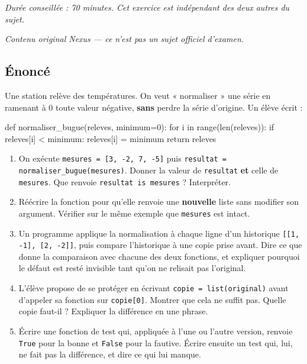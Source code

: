 \textit{Durée conseillée : 70 minutes. Cet exercice est indépendant des deux
autres du sujet.}

\medskip
\textit{Contenu original Nexus --- ce n'est pas un sujet officiel d'examen.}

\subsection*{Énoncé}

Une station relève des températures. On veut « normaliser » une série en
ramenant à $0$ toute valeur négative, \textbf{sans} perdre la série d'origine.
Un élève écrit :

\begin{python}
def normaliser_bugue(releves, minimum=0):
    for i in range(len(releves)):
        if releves[i] < minimum:
            releves[i] = minimum
    return releves
\end{python}

\begin{enumerate}
  \item On exécute \lstinline{mesures = [3, -2, 7, -5]} puis
    \lstinline{resultat = normaliser_bugue(mesures)}. Donner la valeur de
    \lstinline{resultat} \textbf{et} celle de \lstinline{mesures}. Que renvoie
    \lstinline{resultat is mesures} ? Interpréter.

  \item Réécrire la fonction pour qu'elle renvoie une \textbf{nouvelle} liste
    sans modifier son argument. Vérifier sur le même exemple que
    \lstinline{mesures} est intact.

  \item Un programme applique la normalisation à chaque ligne d'un historique
    \lstinline{[[1, -1], [2, -2]]}, puis compare l'historique à une copie prise
    avant. Dire ce que donne la comparaison avec chacune des deux fonctions, et
    expliquer pourquoi le défaut est resté invisible tant qu'on ne relisait pas
    l'original.

  \item L'élève propose de se protéger en écrivant
    \lstinline{copie = list(original)} avant d'appeler sa fonction sur
    \lstinline{copie[0]}. Montrer que cela ne suffit pas. Quelle copie faut-il ?
    Expliquer la différence en une phrase.

  \item Écrire une fonction de test qui, appliquée à l'une ou l'autre version,
    renvoie \lstinline{True} pour la bonne et \lstinline{False} pour la fautive.
    Écrire ensuite un test qui, lui, ne fait pas la différence, et dire ce qui
    lui manque.
\end{enumerate}

